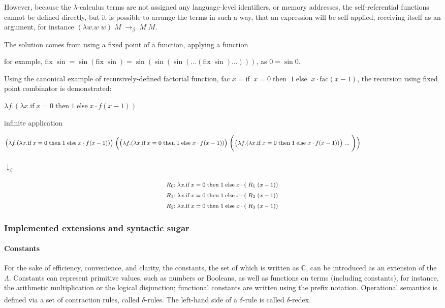 \documentclass[table, a4paper, 10pt]{article}
\newcommand{\cit}[1]{\textsuperscript{\cite{#1}}}
\begin{document}
However, because the $\lambda$-calculus terms are not assigned any language-level identifiers, or memory addresses,
the self-referential functions cannot be defined directly, but it is possible to
arrange the terms in such a way, that an expression will be self-applied, receiving
itself as an argument, for instance $(\lambda w.w\;w)\;M\;\to_\beta\;M\;M$.

The solution comes from using a fixed point of a function, applying a function

for example, $\mathrm{fix}\;\sin = \sin(\mathrm{fix}\;\sin) = \sin(\sin(\sin(...(\mathrm{fix}\;\sin)...)))$, as $0 = \sin 0$.

Using the canonical example of recursively-defined factorial function,
\mbox{$\mathrm{fac}\;x = \text{if}\;\;x = 0\;\text{then}\;\;1\;\text{else}\;\;x \cdot \mathrm{fac}(x-1)$,}
the recursion using fixed point combinator is demonstrated:

$\lambda f.(\lambda x. \text{if}\;x = 0\;\text{then}\;1\;\text{else}\;x\cdot f(x - 1))$

infinite application

$\text{\footnotesize$
\big(\lambda f.(\lambda x. \text{if}\;x = 0\;\text{then}\;1\;\text{else}\;x\cdot f(x - 1))\big)
\;\Big(\big(\lambda f.(\lambda x. \text{if}\;x = 0\;\text{then}\;1\;\text{else}\;x\cdot f(x - 1))\big)
\;\Bigg(\big(\lambda f.(\lambda x. \text{if}\;x = 0\;\text{then}\;1\;\text{else}\;x\cdot f(x - 1))\big)
\;...\;\Bigg)\Big)
$}$

$\downarrow_\beta$

\begin{align*}
\text{\footnotesize$R_0{:}\; \lambda x. \text{if}\;x = 0\;\text{then}\;1\;\text{else}\;x\cdot (\;R_1\;(x - 1))$}\\
\text{\footnotesize$R_1{:}\; \lambda x. \text{if}\;x = 0\;\text{then}\;1\;\text{else}\;x\cdot (\;R_2\;(x - 1))$}\\
\text{\footnotesize$R_2{:}\; \lambda x. \text{if}\;x = 0\;\text{then}\;1\;\text{else}\;x\cdot (\;R_3\;(x - 1))$}
\end{align*}


\subsubsection{Implemented extensions and syntactic sugar}\label{sec:extensions}
\paragraph{Constants}
For the sake of efficiency, convenience, and clarity, the constants, the set
of which is written as $\mathbb{C}$, can be introduced as
an extension of the $\Lambda$. Constants can represent primitive values,
such as numbers or Booleans, as well as functions on terms (including constants), for instance,
the arithmetic multiplication or the logical disjunction; functional constants
are written using the prefix notation. Operational semantics
is defined via a set of contraction rules, called $\delta$-rules.\cit{baren94}
The left-hand side of a $\delta$-rule is called $\delta$-redex.
\end{document}
